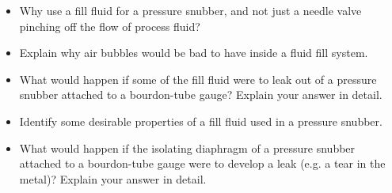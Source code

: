 \begin{itemize}
\item{} Why use a fill fluid for a pressure snubber, and not just a needle valve pinching off the flow of process fluid?
\item{} Explain why air bubbles would be bad to have inside a fluid fill system.
\item{} What would happen if some of the fill fluid were to leak out of a pressure snubber attached to a bourdon-tube gauge?  Explain your answer in detail.
\item{} Identify some desirable properties of a fill fluid used in a pressure snubber.
\item{} What would happen if the isolating diaphragm of a pressure snubber attached to a bourdon-tube gauge were to develop a leak (e.g. a tear in the metal)?  Explain your answer in detail.
\end{itemize}





